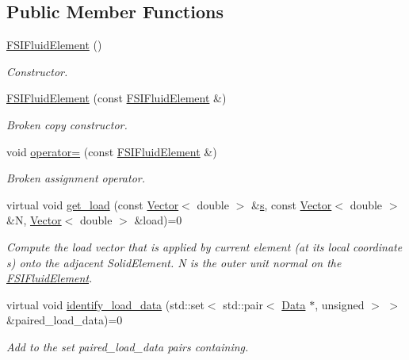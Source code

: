 \subsection*{Public Member Functions}
\begin{DoxyCompactItemize}
\item 
\hyperlink{classoomph_1_1FSIFluidElement_a7de98463543c9e0661d4a9b248f71724}{F\+S\+I\+Fluid\+Element} ()
\begin{DoxyCompactList}\small\item\em Constructor. \end{DoxyCompactList}\item 
\hyperlink{classoomph_1_1FSIFluidElement_a28c2f33a00254914cb70cd10841ed8d0}{F\+S\+I\+Fluid\+Element} (const \hyperlink{classoomph_1_1FSIFluidElement}{F\+S\+I\+Fluid\+Element} \&)
\begin{DoxyCompactList}\small\item\em Broken copy constructor. \end{DoxyCompactList}\item 
void \hyperlink{classoomph_1_1FSIFluidElement_a5d5b8b33130b85f908b04fc2d8ddd691}{operator=} (const \hyperlink{classoomph_1_1FSIFluidElement}{F\+S\+I\+Fluid\+Element} \&)
\begin{DoxyCompactList}\small\item\em Broken assignment operator. \end{DoxyCompactList}\item 
virtual void \hyperlink{classoomph_1_1FSIFluidElement_acf10e6a716b5e0f743579dfce32e9294}{get\+\_\+load} (const \hyperlink{classoomph_1_1Vector}{Vector}$<$ double $>$ \&\hyperlink{cfortran_8h_ab7123126e4885ef647dd9c6e3807a21c}{s}, const \hyperlink{classoomph_1_1Vector}{Vector}$<$ double $>$ \&N, \hyperlink{classoomph_1_1Vector}{Vector}$<$ double $>$ \&load)=0
\begin{DoxyCompactList}\small\item\em Compute the load vector that is applied by current element (at its local coordinate s) onto the adjacent Solid\+Element. N is the outer unit normal on the \hyperlink{classoomph_1_1FSIFluidElement}{F\+S\+I\+Fluid\+Element}. \end{DoxyCompactList}\item 
virtual void \hyperlink{classoomph_1_1FSIFluidElement_a13c5f835cddd1b78e6d2582733619300}{identify\+\_\+load\+\_\+data} (std\+::set$<$ std\+::pair$<$ \hyperlink{classoomph_1_1Data}{Data} $\ast$, unsigned $>$ $>$ \&paired\+\_\+load\+\_\+data)=0
\begin{DoxyCompactList}\small\item\em Add to the set {\ttfamily paired\+\_\+load\+\_\+data} pairs containing. \end{DoxyCompactList}\item 

\end{DoxyCompactItemize}
